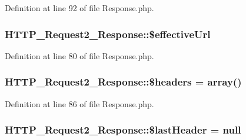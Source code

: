Definition at line 92 of file Response.\+php.

\subsubsection[{\texorpdfstring{\$effective\+Url}{$effectiveUrl}}]{\setlength{\rightskip}{0pt plus 5cm}H\+T\+T\+P\+\_\+\+Request2\+\_\+\+Response\+::\$effective\+Url\hspace{0.3cm}{\ttfamily [protected]}}\hypertarget{classHTTP__Request2__Response_ab87ff3f614066accc95a6f29f23bc051}{}\label{classHTTP__Request2__Response_ab87ff3f614066accc95a6f29f23bc051}


Definition at line 80 of file Response.\+php.

\subsubsection[{\texorpdfstring{\$headers}{$headers}}]{\setlength{\rightskip}{0pt plus 5cm}H\+T\+T\+P\+\_\+\+Request2\+\_\+\+Response\+::\$headers = array()\hspace{0.3cm}{\ttfamily [protected]}}\hypertarget{classHTTP__Request2__Response_a17017d7d7f6452267ba57ecd0e10fa35}{}\label{classHTTP__Request2__Response_a17017d7d7f6452267ba57ecd0e10fa35}


Definition at line 86 of file Response.\+php.

\subsubsection[{\texorpdfstring{\$last\+Header}{$lastHeader}}]{\setlength{\rightskip}{0pt plus 5cm}H\+T\+T\+P\+\_\+\+Request2\+\_\+\+Response\+::\$last\+Header = {\bf null}\hspace{0.3cm}{\ttfamily [protected]}}\hypertarget{classHTTP__Request2__Response_adcf7a1e02f6e5d9eac767466f8551a1e}{}\label{classHTTP__Request2__Response_adcf7a1e02f6e5d9eac767466f8551a1e}


